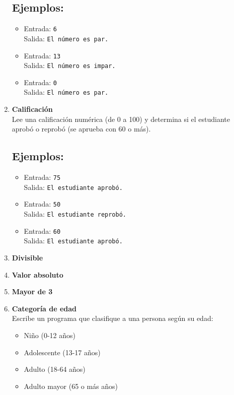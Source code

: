 \begin{enumerate}
    \subsection*{Ejemplos:}
    \begin{itemize}
        \item Entrada: \texttt{6}\\
              Salida: \texttt{El número es par.}
        \item Entrada: \texttt{13}\\
              Salida: \texttt{El número es impar.}
        \item Entrada: \texttt{0}\\
              Salida: \texttt{El número es par.}
    \end{itemize}

    \item \textbf{Calificación}\\
    Lee una calificación numérica (de 0 a 100) y determina si el estudiante aprobó o reprobó (se aprueba con 60 o más).
    \subsection*{Ejemplos:}
    \begin{itemize}
        \item Entrada: \texttt{75}\\
              Salida: \texttt{El estudiante aprobó.}
        \item Entrada: \texttt{50}\\
              Salida: \texttt{El estudiante reprobó.}
        \item Entrada: \texttt{60}\\
              Salida: \texttt{El estudiante aprobó.}
    \end{itemize}
    
    \item \textbf{Divisible}\\
    

    \item \textbf{Valor absoluto}\\
    

    \item \textbf{Mayor de 3}\\
    

    \item \textbf{Categoría de edad}\\
    Escribe un programa que clasifique a una persona según su edad:
    \begin{itemize}
        \item Niño (0-12 años)
        \item Adolescente (13-17 años)
        \item Adulto (18-64 años)
        \item Adulto mayor (65 o más años)
    \end{itemize}

\end{enumerate}
